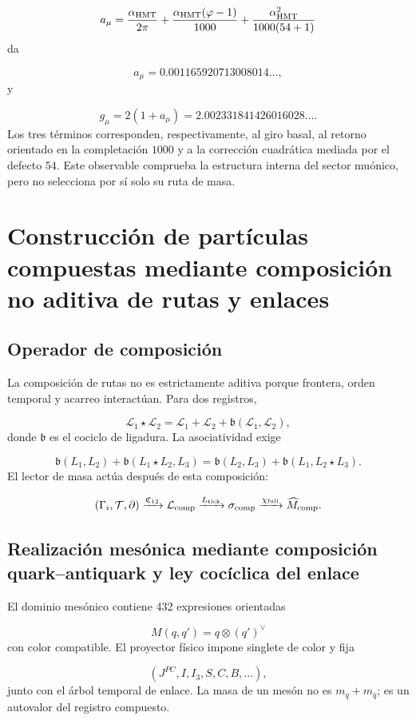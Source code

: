 \[
 a_\mu=
 \frac{\alpha_{\rm HMT}}{2\pi}
 +\frac{\alpha_{\rm HMT}(\varphi-1)}{1000}
 +\frac{\alpha_{\rm HMT}^2}{1000(54+1)}
\]
da

\[
 a_\mu=0.001165920713008014\ldots,
\]
y

\[
 g_\mu=2(1+a_\mu)
 =2.002331841426016028\ldots.
\]
Los tres términos corresponden, respectivamente, al giro basal, al retorno orientado en la completación \(1000\) y a la corrección cuadrática mediada por el defecto \(54\). Este observable comprueba la estructura interna del sector muónico, pero no selecciona por sí solo su ruta de masa.

\section{Construcción de partículas compuestas mediante composición no aditiva de rutas y enlaces}
\subsection{Operador de composición}
La composición de rutas no es estrictamente aditiva porque frontera, orden temporal y acarreo interactúan. Para dos registros,

\[
 \mathcal L_1\star\mathcal L_2
 =\mathcal L_1+\mathcal L_2
 +\mathfrak b(\mathcal L_1,\mathcal L_2),
\]
donde \(\mathfrak b\) es el cociclo de ligadura. La asociatividad exige

\[
 \mathfrak b(L_1,L_2)
 +\mathfrak b(L_1\star L_2,L_3)
 =
 \mathfrak b(L_2,L_3)
 +\mathfrak b(L_1,L_2\star L_3).
\]
El lector de masa actúa después de esta composición:

\[
 (\Gamma_i,\mathcal T,\partial)
 \xrightarrow{\mathfrak C_{12}}
 \mathcal L_{\rm comp}
 \xrightarrow{L_{\rm tick}}
 \sigma_{\rm comp}
 \xrightarrow{\chi_{\rm full}}
 \widehat M_{\rm comp}.
\]
\subsection{Realización mesónica mediante composición quark–antiquark y ley cocíclica del enlace}
El dominio mesónico contiene 432 expresiones orientadas

\[
 M(q,q')=q\otimes(q')^\vee
\]
con color compatible. El proyector físico impone singlete de color y fija

\[
 (J^{PC},I,I_3,S,C,B,\ldots),
\]
junto con el árbol temporal de enlace. La masa de un mesón no es \(m_q+m_{\bar q}\); es un autovalor del registro compuesto.

